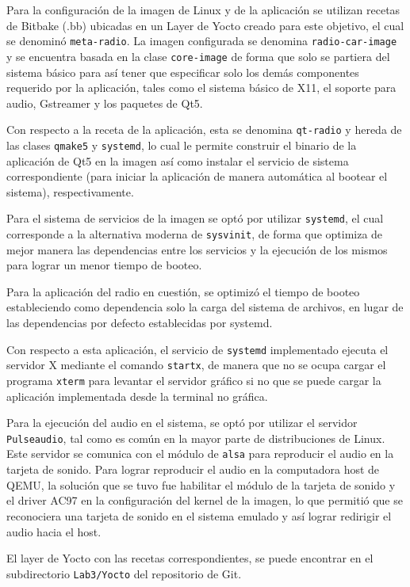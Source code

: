 Para la configuración de la imagen de Linux y de la aplicación se utilizan
recetas de Bitbake (.bb) ubicadas en un Layer de Yocto creado para este objetivo, el cual
se denominó \texttt{meta-radio}. La imagen configurada se denomina
\texttt{radio-car-image} y se encuentra basada en la clase \texttt{core-image}
de forma que solo se partiera del sistema básico para así tener que especificar solo los demás
componentes requerido por la aplicación, tales como el sistema básico de X11, el
soporte para audio, Gstreamer y los paquetes de Qt5.

Con respecto a la receta de la aplicación, esta se denomina \texttt{qt-radio} y
hereda de las clases \texttt{qmake5} y \texttt{systemd}, lo cual le permite
construir el binario de la aplicación de Qt5 en la imagen así como instalar el servicio de sistema
correspondiente (para iniciar la aplicación de manera automática al bootear el sistema), respectivamente.

Para el sistema de servicios de la imagen se optó por utilizar \texttt{systemd},
el cual corresponde a la alternativa moderna de \texttt{sysvinit}, de forma que
optimiza de mejor manera las dependencias entre los servicios y la ejecución de
los mismos para lograr un menor tiempo de booteo.

Para la aplicación del radio en cuestión, se optimizó el tiempo de booteo
estableciendo como dependencia solo la carga del sistema de archivos, en lugar
de las dependencias por defecto establecidas por systemd.

Con respecto a esta aplicación, el servicio de \texttt{systemd} implementado
ejecuta el servidor X mediante el comando \texttt{startx}, de manera que no se
ocupa cargar el programa \texttt{xterm} para levantar el servidor gráfico si no
que se puede cargar la aplicación implementada desde la terminal no gráfica.

Para la ejecución del audio en el sistema, se optó por utilizar el servidor
\texttt{Pulseaudio}, tal como es común en la mayor parte de distribuciones de
Linux. Este servidor se comunica con el módulo de \texttt{alsa} para reproducir
el audio en la tarjeta de sonido. Para lograr reproducir el audio en la
computadora host de QEMU, la solución que se tuvo fue habilitar el módulo de la
tarjeta de sonido y el driver AC97 en la configuración del kernel de la imagen,
lo que permitió que se reconociera una tarjeta de sonido en el sistema emulado y
así lograr redirigir el audio hacia el host.

El layer de Yocto con las recetas correspondientes, se puede encontrar en el
subdirectorio \texttt{Lab3/Yocto} del repositorio de Git.


